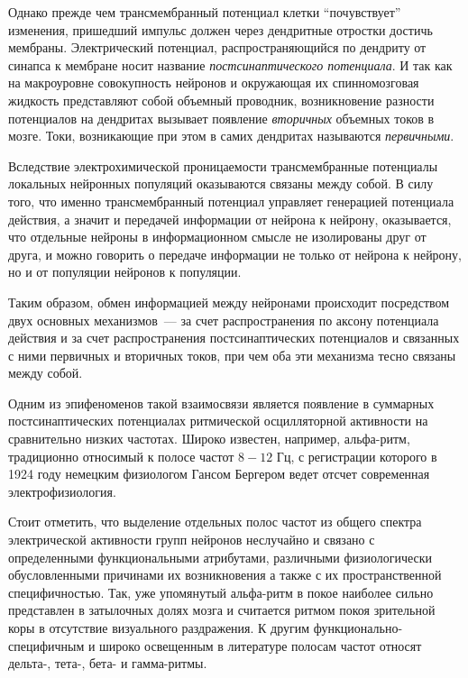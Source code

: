 Однако прежде чем трансмембранный потенциал клетки ``почувствует'' изменения,
пришедший импульс должен через дендритные отростки достичь мембраны.
Электрический потенциал, распространяющийся по дендриту от синапса к мембране
носит название \emph{постсинаптического потенциала}.
И так как на макроуровне совокупность нейронов
и окружающая их спинномозговая жидкость представляют собой объемный проводник,
возникновение разности потенциалов на дендритах
вызывает появление \emph{вторичных} объемных токов в мозге. Токи, возникающие при этом
в самих дендритах называются \emph{первичными}.

Вследствие электрохимической проницаемости трансмембранные потенциалы
локальных нейронных популяций оказываются связаны между собой. В силу того, что
именно трансмембранный потенциал управляет генерацией потенциала действия, а
значит и передачей информации от нейрона к нейрону, оказывается, что отдельные
нейроны в информационном смысле не изолированы друг от друга, и можно говорить
о передаче информации не только от нейрона к нейрону, но и от популяции
нейронов к популяции.

Таким образом, обмен информацией между нейронами происходит посредством двух
основных механизмов~--- за счет распространения по аксону потенциала действия и
за счет распространения постсинаптических потенциалов и связанных с ними первичных и вторичных токов,
при чем оба эти механизма тесно связаны между собой.

Одним из эпифеноменов такой взаимосвязи является появление в
суммарных постсинаптических потенциалах ритмической осцилляторной активности
на сравнительно низких частотах.  Широко известен, например, альфа-ритм,
традиционно относимый к полосе частот $8-12$ Гц, с регистрации которого в 1924
году немецким физиологом Гансом Бергером ведет отсчет современная
электрофизиология.

Стоит отметить, что выделение отдельных полос частот из общего спектра
электрической активности групп нейронов неслучайно и связано с определенными
функциональными атрибутами, различными физиологически обусловленными причинами
их возникновения а также с их пространственной специфичностью.  Так, уже
упомянутый альфа-ритм в покое наиболее сильно представлен в затылочных долях
мозга и считается ритмом покоя зрительной коры в отсутствие визуального
раздражения.  К другим функционально-специфичным и широко освещенным в
литературе полосам частот относят дельта-, тета-, бета- и гамма-ритмы.

